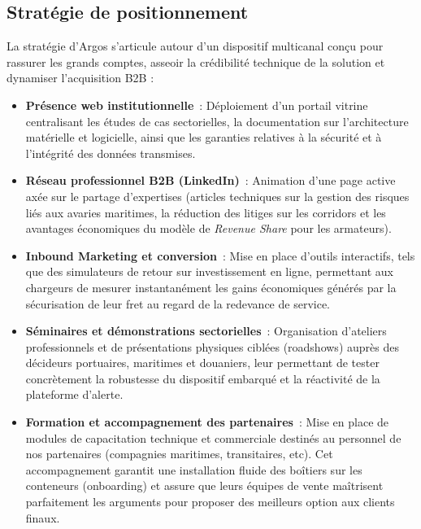 
\subsection{Stratégie de positionnement}

La stratégie d’Argos s'articule autour d'un dispositif multicanal conçu pour rassurer les grands comptes, asseoir la crédibilité technique de la solution et dynamiser l'acquisition B2B :
\begin{itemize}[label=\textcolor{argosblue}{\textbf{>}}]
    \item \textbf{Présence web institutionnelle}~: Déploiement d’un portail vitrine centralisant les études de cas sectorielles, la documentation sur l'architecture matérielle et logicielle, ainsi que les garanties relatives à la sécurité et à l'intégrité des données transmises.
    
    \item \textbf{Réseau professionnel B2B (LinkedIn)}~: Animation d’une page active axée sur le partage d'expertises (articles techniques sur la gestion des risques liés aux avaries maritimes, la réduction des litiges sur les corridors et les avantages économiques du modèle de \textit{Revenue Share} pour les armateurs).
    
    \item \textbf{Inbound Marketing et conversion}~: Mise en place d’outils interactifs, tels que des simulateurs de retour sur investissement en ligne, permettant aux chargeurs de mesurer instantanément les gains économiques générés par la sécurisation de leur fret au regard de la redevance de service.
    
    \item \textbf{Séminaires et démonstrations sectorielles}~: Organisation d'ateliers professionnels et de présentations physiques ciblées (roadshows) auprès des décideurs portuaires, maritimes et douaniers, leur permettant de tester concrètement la robustesse du dispositif embarqué et la réactivité de la plateforme d'alerte.
    
    \item \textbf{Formation et accompagnement des partenaires}~: Mise en place de modules de capacitation technique et commerciale destinés au personnel de nos partenaires (compagnies maritimes, transitaires, etc). Cet accompagnement garantit une installation fluide des boîtiers sur les conteneurs (onboarding) et assure que leurs équipes de vente maîtrisent parfaitement les arguments pour proposer des meilleurs option aux clients finaux.
\end{itemize}

